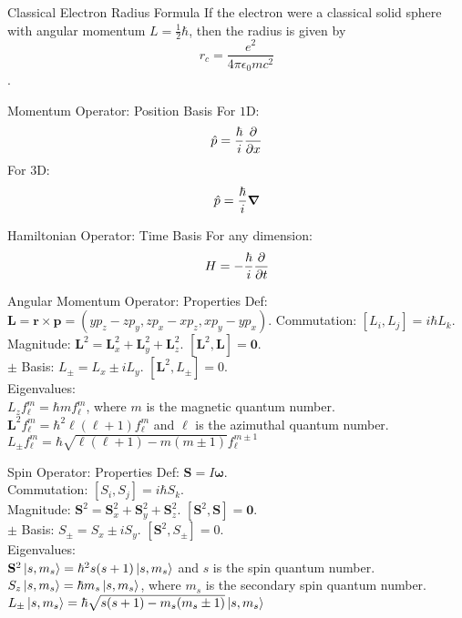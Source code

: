 \documentclass[avery5371,grid]{flashcards}
\begin{document}
\begin{flashcard}[Formula]{Classical Electron Radius Formula}
	If the electron were a classical solid sphere with angular momentum $L = \frac{1}{2}\hbar$, then the radius is given by $$r_c = \frac{e^2}{4\pi \epsilon_0 mc^2}$$.
\end{flashcard}

\begin{flashcard}[Definition]{Momentum Operator: Position Basis}
	For $1$D: 
	$$\hat{p} = \frac{\hbar}{i}\pdv{x}$$
	For $3$D:
	$$\hat{p} = \frac{\hbar}{i}\grad$$
\end{flashcard}

\begin{flashcard}[Definition]{Hamiltonian Operator: Time Basis}
	For any dimension: $$H=-\frac{\hbar}{i}\pdv{t}$$
\end{flashcard}

\begin{flashcard}[Definition]{Angular Momentum Operator: Properties}
	Def: $\mathbf{L} = \mathbf{r}\times\mathbf{p}=(yp_z - zp_y, zp_x-xp_z, xp_y - yp_x).$
	Commutation: $[L_i,L_j] = i\hbar L_k$.\\
	Magnitude: $\mathbf{L}^2 = \mathbf{L}_x^2+\mathbf{L}_y^2 + \mathbf{L}_z^2$. $[\mathbf{L}^2,\mathbf{L}] = \boldsymbol{0}$.\\
	$\pm$ Basis: $L_{\pm} = L_x \pm iL_y$. $[\mathbf{L}^2, L_{\pm}]= 0$.\\
	Eigenvalues: \\
	$L_z f_\ell^m = \hbar m  f_\ell^m$, where $m$ is the magnetic quantum number.\\
	$\mathbf{L}^2  f_\ell^m = \hbar^2\ell(\ell+1) f_\ell^m$ and $\ell$ is the azimuthal quantum number.\\
	$L_{\pm}f^m_\ell = \hbar\sqrt{\ell(\ell+1)-m(m\pm1)}f^{m\pm1}_{\ell}$ 
\end{flashcard}

\begin{flashcard}[Definition]{Spin Operator: Properties}
	Def: $\mathbf{S}= I\mathbf{\omega}$.\\
	Commutation: $[S_i,S_j] = i\hbar S_k$.\\
	Magnitude: $\mathbf{S}^2 = \mathbf{S}_x^2+\mathbf{S}_y^2 + \mathbf{S}_z^2$. $[\mathbf{S}^2,\mathbf{S}] = \mathbf{0}$.\\
	$\pm$ Basis: $S_{\pm} = S_x \pm iS_y$. $[\mathbf{S}^2, S_{\pm}]= 0$.\\
	Eigenvalues: \\
	$\mathbf{S}^2  \ket{s,m_s} = \hbar^2s (s+1) \ket{s,m_s}$ and $s$ is the spin quantum number.\\
	$S_z \ket{s,m_s} = \hbar m_s \ket{s,m_s}$, where $m_s$ is the secondary spin quantum number.\\
	$L_{\pm}\ket{s,m_s}= \hbar\sqrt{s(s+1)-m_s(m_s\pm1)}\ket{s,m_s}$ 
\end{flashcard}
\end{document}
